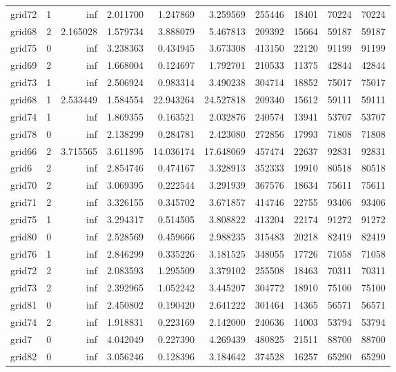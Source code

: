 \begin{longtable}{|l|r|r|r|r|r|r|r|r|r|}
grid72 & 1 & inf & 2.011700 & 1.247869 & 3.259569 & 255446 & 18401 & 70224 & 70224 \\
grid68 & 2 & 2.165028 & 1.579734 & 3.888079 & 5.467813 & 209392 & 15664 & 59187 & 59187 \\
grid75 & 0 & inf & 3.238363 & 0.434945 & 3.673308 & 413150 & 22120 & 91199 & 91199 \\
grid69 & 2 & inf & 1.668004 & 0.124697 & 1.792701 & 210533 & 11375 & 42844 & 42844 \\
grid73 & 1 & inf & 2.506924 & 0.983314 & 3.490238 & 304714 & 18852 & 75017 & 75017 \\
grid68 & 1 & 2.533449 & 1.584554 & 22.943264 & 24.527818 & 209340 & 15612 & 59111 & 59111 \\
grid74 & 1 & inf & 1.869355 & 0.163521 & 2.032876 & 240574 & 13941 & 53707 & 53707 \\
grid78 & 0 & inf & 2.138299 & 0.284781 & 2.423080 & 272856 & 17993 & 71808 & 71808 \\
grid66 & 2 & 3.715565 & 3.611895 & 14.036174 & 17.648069 & 457474 & 22637 & 92831 & 92831 \\
grid6 & 2 & inf & 2.854746 & 0.474167 & 3.328913 & 352333 & 19910 & 80518 & 80518 \\
grid70 & 2 & inf & 3.069395 & 0.222544 & 3.291939 & 367576 & 18634 & 75611 & 75611 \\
grid71 & 2 & inf & 3.326155 & 0.345702 & 3.671857 & 414746 & 22755 & 93406 & 93406 \\
grid75 & 1 & inf & 3.294317 & 0.514505 & 3.808822 & 413204 & 22174 & 91272 & 91272 \\
grid80 & 0 & inf & 2.528569 & 0.459666 & 2.988235 & 315483 & 20218 & 82419 & 82419 \\
grid76 & 1 & inf & 2.846299 & 0.335226 & 3.181525 & 348055 & 17726 & 71058 & 71058 \\
grid72 & 2 & inf & 2.083593 & 1.295509 & 3.379102 & 255508 & 18463 & 70311 & 70311 \\
grid73 & 2 & inf & 2.392965 & 1.052242 & 3.445207 & 304772 & 18910 & 75100 & 75100 \\
grid81 & 0 & inf & 2.450802 & 0.190420 & 2.641222 & 301464 & 14365 & 56571 & 56571 \\
grid74 & 2 & inf & 1.918831 & 0.223169 & 2.142000 & 240636 & 14003 & 53794 & 53794 \\
grid7 & 0 & inf & 4.042049 & 0.227390 & 4.269439 & 480825 & 21511 & 88700 & 88700 \\
grid82 & 0 & inf & 3.056246 & 0.128396 & 3.184642 & 374528 & 16257 & 65290 & 65290 \\

\end{longtable}
